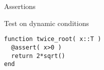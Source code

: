 
 {Assertions}

Test on dynamic conditions
\begin{lstlisting}
function twice_root( x::T )
  @assert( x>0 )
  return 2*sqrt()
end
\end{lstlisting}
